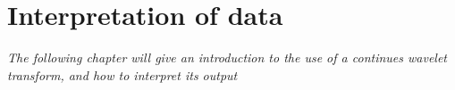 \chapter{Interpretation of data}
\textit{The following chapter will give an introduction to the use of a continues wavelet transform, and how to interpret its output}